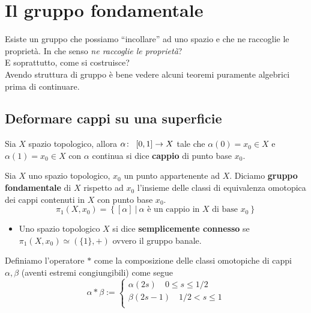 \newpage
\section{Il gruppo fondamentale}
Esiste un gruppo che possiamo \enquote{incollare} ad uno spazio e che ne raccoglie le proprietà. In che senso \textit{ne raccoglie le proprietà}? \\ E soprattutto, come si costruisce? \\ Avendo struttura di gruppo è bene vedere alcuni teoremi puramente algebrici prima di continuare.
\subsection{\textcolor{TopAlg}{\textbf{Deformare cappi su una superficie}}}

\begin{definition}
	Sia $X$ spazio topologico, allora $\alpha \colon\ \left[0,1\right] \rightarrow X$ tale che $\alpha(0) = x_0 \in X$ e $\alpha(1) = x_0 \in X$ con $\alpha$ continua si dice \textbf{cappio} di punto base $x_0$.
\end{definition}

\begin{definition} Sia $X$ uno spazio topologico, $x_0$ un punto appartenente ad $X$. Diciamo \textbf{gruppo fondamentale} di $X$ rispetto ad $x_0$ l'insieme delle classi di equivalenza omotopica dei cappi contenuti in $X$ con punto base $x_0$.
	\begin{equation*}
	\pi_1(X,x_0)= \left\{[\alpha] \ \big| \ \alpha \text{ è un cappio in $X$ di base $x_0$}\right\}
	\end{equation*}
	\begin{itemize}
		\item Uno spazio topologico $X$ si dice \textbf{semplicemente connesso} se $\pi_1(X, x_0) \simeq (\{1\}, +)$ ovvero il gruppo banale. 
	\end{itemize}
\end{definition}

\begin{definition}
	Definiamo l'operatore $*$ come la composizione delle classi omotopiche di cappi $\alpha, \beta$ (aventi estremi congiungibili) come segue
	\begin{equation*}
	\alpha * \beta :=
	\begin{cases}
		\alpha(2s) \quad 0 \le s \le 1/2 \\
		\beta(2s - 1) \quad 1/2 < s \le 1 \\ 
	\end{cases}
	\end{equation*}
\end{definition}

